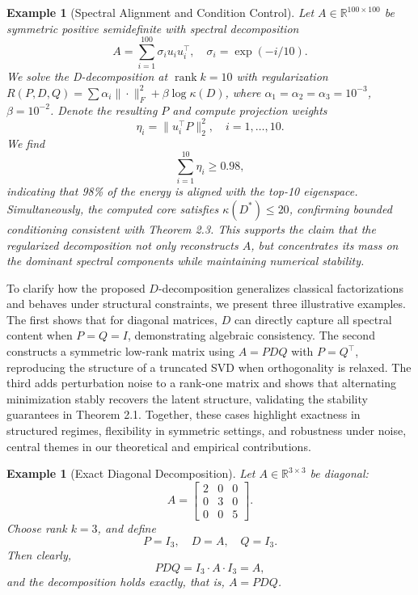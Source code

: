 \documentclass[10pt,a4paper]{article}
\newtheorem{example}[theorem]{\bf Example}
\begin{document}

\begin{example}[Spectral Alignment and Condition Control]
Let \( A \in \mathbb{R}^{100 \times 100} \) be symmetric positive semidefinite with spectral decomposition
\[
A = \sum_{i=1}^{100} \sigma_i u_i u_i^\top, \quad \sigma_i = \exp(-i/10).
\]
We solve the D-decomposition at \( \operatorname{rank} k = 10 \) with regularization \( R(P, D, Q) = \sum \alpha_i \| \cdot \|_F^2 + \beta \log \kappa(D) \), where \( \alpha_1 = \alpha_2 = \alpha_3 = 10^{-3} \), \( \beta = 10^{-2} \). Denote the resulting \( P \) and compute projection weights
\[
\eta_i = \| u_i^\top P \|_2^2, \quad i = 1, \ldots, 10.
\]
We find
\[
\sum_{i=1}^{10} \eta_i \geq 0.98,
\]
indicating that 98\% of the energy is aligned with the top-10 eigenspace. Simultaneously, the computed core satisfies \( \kappa(D^*) \leq 20 \), confirming bounded conditioning consistent with Theorem 2.3. This supports the claim that the regularized decomposition not only reconstructs \( A \), but concentrates its mass on the dominant spectral components while maintaining numerical stability.
\end{example}To clarify how the proposed $D$-decomposition generalizes classical factorizations and behaves under structural constraints, we present three illustrative examples. The first shows that for diagonal matrices, $D$ can directly capture all spectral content when $P = Q = I$, demonstrating algebraic consistency. The second constructs a symmetric low-rank matrix using $A = PDQ$ with $P = Q^\top$, reproducing the structure of a truncated SVD when orthogonality is relaxed. The third adds perturbation noise to a rank-one matrix and shows that alternating minimization stably recovers the latent structure, validating the stability guarantees in Theorem 2.1. Together, these cases highlight exactness in structured regimes, flexibility in symmetric settings, and robustness under noise,  central themes in our theoretical and empirical contributions.

\begin{example}[Exact Diagonal Decomposition]
Let $A \in \mathbb{R}^{3 \times 3}$ be diagonal:
\[
A = \begin{bmatrix}
2 & 0 & 0 \\
0 & 3 & 0 \\
0 & 0 & 5
\end{bmatrix}.
\]
Choose rank $k = 3$, and define
\[
P = I_3, \quad D = A, \quad Q = I_3.
\]
Then clearly,
\[
P D Q = I_3 \cdot A \cdot I_3 = A,
\]
and the decomposition holds exactly, that is, $A = PDQ$.
\end{example}
\end{document}
